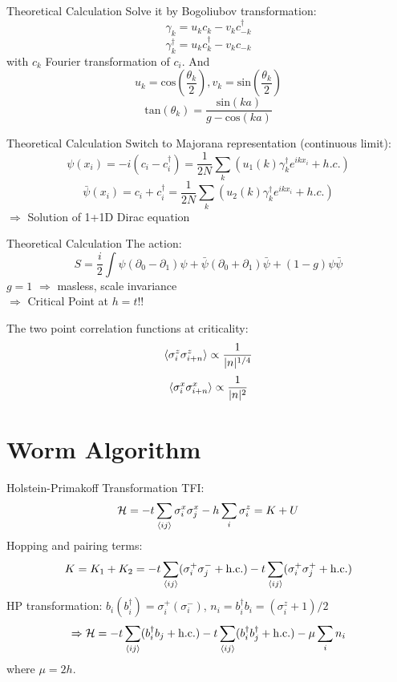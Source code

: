 \documentclass[aspectratio=43]{beamer}
\begin{document}
\begin{frame}{Theoretical Calculation}
Solve it by Bogoliubov transformation:
\[
\gamma_k=u_kc_k-v_kc_{-k}^{\dagger}
\]
\[
\gamma_k^{\dagger}=u_kc_k^{\dagger}-v_kc_{-k}
\]
with $c_k$ Fourier transformation of $c_i$. And
\[
u_k=\mathrm{cos}\left( \frac{\theta_k}{2}\right), v_k=\mathrm{sin}\left( \frac{\theta_k}{2}\right) 
\]
\[
\mathrm{tan}\left(\theta_k\right)=\frac{\mathrm{sin}(ka)}{g-\mathrm{cos}(ka)}
\]
\end{frame}

\begin{frame}{Theoretical Calculation}
Switch to Majorana representation (continuous limit):
\[
\psi(x_i)=-i(c_i-c_i^{\dagger})=\frac{1}{2N}\sum_k(u_1(k)\gamma_k^{\dagger}e^{ikx_i}+h.c.)
\]
\[
\bar{\psi}(x_i)=c_i+c_i^{\dagger}=\frac{1}{2N}\sum_k(u_2(k)\gamma_k^{\dagger}e^{ikx_i}+h.c.)
\]
$\Longrightarrow$ Solution of 1+1D Dirac equation
\end{frame}

\begin{frame}{Theoretical Calculation}
The action:
\[
S=\frac{i}{2}\int\psi(\partial_0-\partial_1)\psi+\bar{\psi}(\partial_0+\partial_1)\bar{\psi}+(1-g)\psi\bar{\psi}
\]
$g=1$ $\Longrightarrow$ masless, scale invariance 
\[
\]
$\Longrightarrow$ Critical Point at $h=t$!!
\end{frame}

\begin{frame}
The two point correlation functions at criticality:
\[
\braket{\sigma_i^z\sigma_{i+n}^z}\propto\frac{1}{|n|^{1/4}}
\]
\[
\braket{\sigma_i^x\sigma_{i+n}^x}\propto\frac{1}{|n|^2}
\]
\end{frame}

\section{Worm Algorithm}
\begin{frame}{Holstein-Primakoff Transformation}
  TFI:
  \[
    \mathcal{H} = -t\sum_{\braket{ij}}\sigma_i^x\sigma_j^x - h\sum_{i}\sigma_i^z = K+U
  \]
  Hopping and pairing terms:
  \[
    K = K_1+K_2 = -t\sum_{\braket{ij}}(\sigma_i^+\sigma_j^-+\text{h.c.})-t\sum_{\braket{ij}}(\sigma_i^+\sigma_j^++\text{h.c.})
  \]
  HP transformation: $b_i(b_i^\dag) = \sigma_i^+(\sigma_i^-)$, $n_i = b_i^\dag b_i = (\sigma_i^z+1)/2$
  \[
    \Rightarrow \mathcal{H} = -t\sum_{\braket{ij}}(b_i^\dag b_j+\text{h.c.})-t\sum_{\braket{ij}}(b_i^\dag b_j^\dag+\text{h.c.})-\mu\sum_{i}n_i
  \]
  where $\mu = 2h$.
\end{frame}
\end{document}
